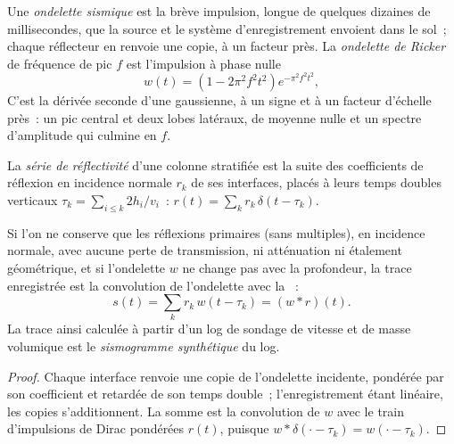 \begin{definition}\label{def:b3:exploration-seismology:wavelet}
Une \emph{ondelette sismique} est la brève impulsion, longue de quelques dizaines
de millisecondes, que la source et le système d'enregistrement envoient dans le
sol~; chaque réflecteur en renvoie une copie, à un facteur près. La \emph{ondelette de
Ricker} de fréquence de pic $f$ est l'impulsion à phase nulle
\[
  w(t) = \left(1 - 2\pi^2f^2t^2\right)e^{-\pi^2f^2t^2},
\]
C'est la dérivée seconde d'une gaussienne, à un signe et à un facteur d'échelle près~: un pic central et
deux lobes latéraux, de moyenne nulle et un spectre d'amplitude qui culmine en $f$.
\end{definition}

\begin{definition}\label{def:b3:exploration-seismology:synthetic}
La \emph{série de réflectivité} d'une colonne stratifiée est la suite des
coefficients de réflexion en incidence normale $r_k$ de ses interfaces,
placés à leurs temps doubles verticaux $\tau_k = \sum_{i \le k} 2h_i/v_i$~:
$r(t) = \sum_k r_k\,\delta(t - \tau_k)$.
\end{definition}

\begin{proposition}\label{prop:b3:exploration-seismology:synthetic}
Si l'on ne conserve que les réflexions primaires (sans multiples), en incidence normale, avec
aucune perte de transmission, ni atténuation ni étalement géométrique, et si l'ondelette $w$ ne
change pas avec la profondeur, la trace enregistrée est la convolution de l'ondelette avec la
~:
\[
  s(t) = \sum_k r_k\,w(t - \tau_k) = (w*r)(t) .
\]
La trace ainsi calculée à partir d'un log de sondage de vitesse et de masse volumique est le
\emph{sismogramme synthétique} du log.
\end{proposition}

\begin{proof}
Chaque interface renvoie une copie de l'ondelette incidente, pondérée par son coefficient
et retardée de son temps double~; l'enregistrement étant linéaire, les copies s'additionnent.
La somme est la convolution de $w$ avec le train d'impulsions de Dirac pondérées
$r(t)$, puisque $w*\delta(\cdot - \tau_k) = w(\cdot - \tau_k)$.
\end{proof}

